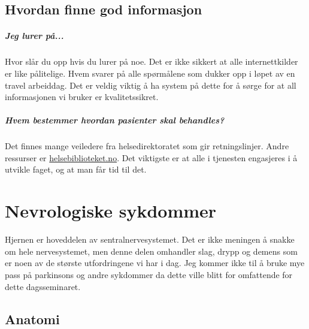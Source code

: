 \documentclass[a4paper,12pt,twoside]{memoir}
\begin{document}
		\section{Hvordan finne god informasjon}
			\paragraph{Jeg lurer på...\\}
				Hvor slår du opp hvis du lurer på noe. Det er ikke sikkert at alle internettkilder er like pålitelige. Hvem svarer på alle spørmålene som dukker opp i løpet av en travel arbeiddag. Det er veldig viktig å ha system på dette for å sørge for at all informasjonen vi bruker er kvalitetssikret. 
			\paragraph{Hvem bestemmer hvordan pasienter skal behandles?\\}
				Det finnes mange veiledere fra helsedirektoratet som gir retningslinjer. Andre ressurser er \href{http://www.helsebiblioteket.no/}{helsebiblioteket.no}. Det viktigste er at alle i tjenesten engasjeres i å utvikle faget, og at man får tid til det. 
	\chapter{Nevrologiske sykdommer}
		Hjernen er hoveddelen av sentralnervesystemet. Det er ikke meningen å snakke om hele nervesystemet, men denne delen omhandler slag, drypp og demens som er noen av de største utfordringene vi har i dag. Jeg kommer ikke til å bruke mye pass på parkinsons og andre sykdommer da dette ville blitt for omfattende for dette dagsseminaret.
		\section{Anatomi}
\end{document}
